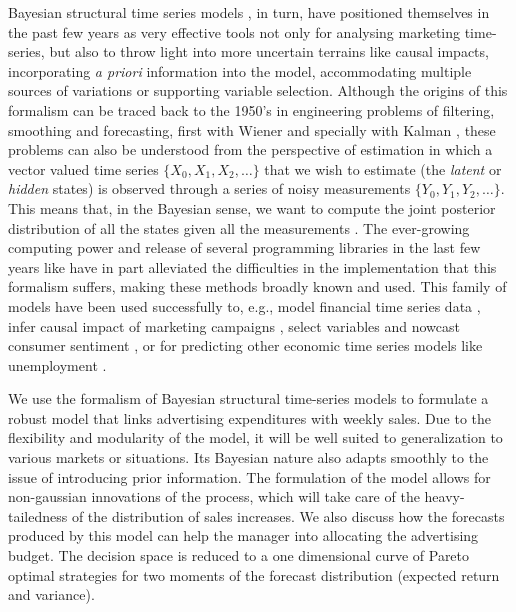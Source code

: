Bayesian structural time series models \parencite{scott2014predicting}, in turn, have positioned themselves in the past few years as very effective tools  not only for analysing marketing time-series, but also to throw light into more uncertain terrains like  causal impacts, incorporating \emph{a priori} information into the model, accommodating multiple sources of variations or supporting variable selection. Although the origins of this formalism can be traced back to the 1950's in engineering problems of filtering, smoothing and forecasting, first with Wiener \parencite{wiener1949extrapolation} and specially with Kalman \parencite{kalman1960new}, these problems can also be understood from the perspective of estimation in which a vector valued time series $\{ X_0, X_1, X_2, \ldots\}$ that we wish to estimate (the \emph{latent} or \emph{hidden} states) is observed through a series of noisy measurements $\{ Y_0, Y_1, Y_2, \ldots\}$. This  means that, in the Bayesian sense, we want to compute the joint posterior distribution of all the states given all the measurements \parencite{sarkka2013bayesian}. The ever-growing computing power and release of several programming libraries  in the last few years like \parencite{petris2010r, scott2016bsts} have in part alleviated the difficulties in the implementation  that this formalism suffers, making these methods broadly known and used. This family of models have been used successfully to, e.g., model financial time series data \parencite{doi:10.1002/asmb.428}, infer causal impact of marketing campaigns \parencite{brodersen2015inferring}, select variables and nowcast consumer sentiment  \parencite{scott2015bayesian}, or for predicting other economic time series models like unemployment \parencite{scott2014predicting}.

We use the formalism of Bayesian structural time-series models to formulate a robust model that links advertising expenditures with weekly sales. Due to the flexibility and modularity of the model, it will be well suited to generalization to various markets or situations. Its Bayesian nature also adapts smoothly to the issue of introducing prior information. The formulation of the model allows for non-gaussian innovations of the process, which will take care of the heavy-tailedness of the distribution of sales increases. We also discuss how the forecasts produced by this model can help the manager into allocating the advertising budget. The decision space is reduced to a one dimensional curve of Pareto optimal strategies for  two moments of the forecast distribution (expected return and variance).

